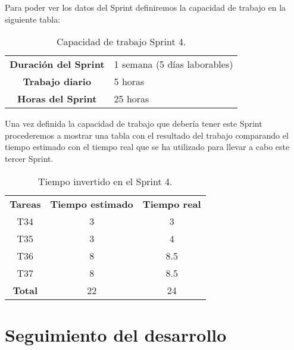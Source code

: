Para poder ver los datos del Sprint definiremos la capacidad de trabajo en la siguiente tabla:

\begin{table}[H]
	\begin{center}
		\begin{tabular}{| c | p{9cm} |}
			\hline

			\textbf{Duración del Sprint} & 1 semana (5 días laborables) \\
			\textbf{Trabajo diario} & 5 horas \\
			\textbf{Horas del Sprint} & 25 horas \\ \hline
		\end{tabular}
		\caption{Capacidad de trabajo Sprint 4.}
	\end{center}
\end{table}

Una vez definida la capacidad de trabajo que debería tener este Sprint procederemos a mostrar una tabla con el resultado del trabajo comparando el tiempo estimado con el tiempo real que se ha utilizado para llevar a cabo este tercer Sprint.

\begin{table}[H]
	\begin{center}
		\begin{tabular}{| c | c | c |}
			\hline

			\textbf{Tareas} & \textbf{Tiempo estimado} & \textbf{Tiempo real} \\
			T34 & 3 & 3 \\
			T35 & 3 & 4 \\
			T36 & 8 & 8.5 \\
			T37 & 8 & 8.5 \\
			\textbf{Total} & 22 & 24 \\ \hline
		\end{tabular}
		\caption{Tiempo invertido en el Sprint 4.}
	\end{center}
\end{table}

\section{Seguimiento del desarrollo}
